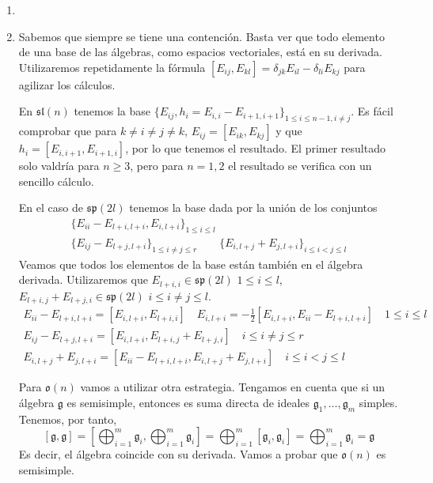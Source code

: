 \documentclass[twoside]{article}
\begin{document}
\begin{solucion}
\begin{enumerate}
\item[]
\item Sabemos que siempre se tiene una contención. Basta ver que todo elemento de una base de las álgebras, como espacios vectoriales, está en su derivada. Utilizaremos repetidamente la fórmula $[E_{ij},E_{kl}]=\delta_{jk}E_{il}-\delta_{li}E_{kj}$ para agilizar los cálculos.

En $\mathfrak{sl}(n)$ tenemos la base $\{E_{ij}, h_i=E_{i,i}-E_{i+1,i+1}\}_{1\leq i\leq n-1, i\neq j}$. Es fácil comprobar que para $k\neq i\neq j\neq k$, $E_{ij}=[E_{ik},E_{kj}]$ y que $h_i=[E_{i,i+1},E_{i+1,i}]$, por lo que tenemos el resultado. El primer resultado solo valdría para $n\geq 3$, pero para $n=1,2$ el resultado se verifica con un sencillo cálculo.

En el caso de $\mathfrak{sp}(2l)$ tenemos la base dada por la unión de los conjuntos
\begin{gather*}
\{E_{ii}-E_{l+i,l+i}, E_{i,l+i}\}_{1\leq i \leq l} \\
\{E_{ij}-E_{l+j,l+i}\}_{1\leq i\neq j\leq r} \qquad \{E_{i,l+j}+E_{j,l+i}\}_{i\leq i<j\leq l}
\end{gather*}
Veamos que todos los elementos de la base están también en el álgebra derivada. Utilizaremos que $E_{l+i,i} \in \mathfrak{sp}(2l)$ $1\leq i \leq l$, $E_{l+i,j}+E_{l+j,i} \in \mathfrak{sp}(2l)$ $i \leq i\neq j \leq l$.
\begin{gather*}
E_{ii}-E_{l+i,l+i}=[E_{i,l+i},E_{l+i,i}] \quad E_{i,l+i} = -\frac{1}{2}[E_{i,l+i},E_{ii}-E_{l+i,l+i}] \quad 1\leq i \leq l\\
E_{ij}-E_{l+j,l+i}=[E_{i,l+i},E_{l+i,j}+E_{l+j,i}] \quad i \leq i \neq j \leq r\\
E_{i,l+j}+E_{j,l+i}=[E_{ii}-E_{l+i,l+i},E_{i,l+j}+E_{j,l+i}]\quad i \leq i < j \leq l
\end{gather*}

Para $\mathfrak{o}(n)$ vamos a utilizar otra estrategia. Tengamos en cuenta que si un álgebra $\mathfrak{g}$ es semisimple, entonces es suma directa de ideales $\mathfrak{g}_1,\dotsc,\mathfrak{g}_m$ simples. Tenemos, por tanto,
$$
[\mathfrak{g},\mathfrak{g}] = \left[\bigoplus_{i=1}^m \mathfrak{g}_i,\bigoplus_{i=1}^m \mathfrak{g}_i\right] = \bigoplus_{i=1}^m [\mathfrak{g}_i,\mathfrak{g}_i] =\bigoplus_{i=1}^m \mathfrak{g}_i = \mathfrak{g}
$$
Es decir, el álgebra coincide con su derivada. Vamos a probar que $\mathfrak{o}(n)$ es semisimple.


\end{enumerate}
\end{solucion}
\end{document}
